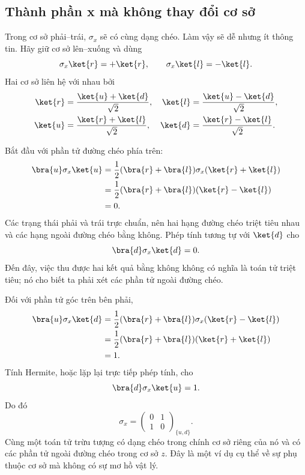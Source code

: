 \subsection{Thành phần x mà không thay đổi cơ sở}

Trong cơ sở phải--trái, \(\sigma_x\) sẽ có cùng dạng chéo. Làm vậy sẽ dễ nhưng ít thông tin. Hãy giữ cơ sở lên--xuống và dùng
\begin{equation}
\sigma_x\ket{r}=+\ket{r},
\qquad
\sigma_x\ket{l}=-\ket{l}.
\label{eq:sigma-x-eigenvectors}
\end{equation}
Hai cơ sở liên hệ với nhau bởi
\begin{align}
\ket{r}&=\frac{\ket{u}+\ket{d}}{\sqrt2},&
\ket{l}&=\frac{\ket{u}-\ket{d}}{\sqrt2},\\
\ket{u}&=\frac{\ket{r}+\ket{l}}{\sqrt2},&
\ket{d}&=\frac{\ket{r}-\ket{l}}{\sqrt2}.
\label{eq:x-z-basis-relations}
\end{align}

Bắt đầu với phần tử đường chéo phía trên:
\begin{align}
\bra{u}\sigma_x\ket{u}
 &=\frac12(\bra{r}+\bra{l})\sigma_x(\ket{r}+\ket{l})\\
 &=\frac12(\bra{r}+\bra{l})(\ket{r}-\ket{l})\\
 &=0.
\end{align}
Các trạng thái phải và trái trực chuẩn, nên hai hạng đường chéo triệt tiêu nhau và các hạng ngoài đường chéo bằng không. Phép tính tương tự với \(\ket{d}\) cho
\[
\bra{d}\sigma_x\ket{d}=0.
\]
Đến đây, việc thu được hai kết quả bằng không không có nghĩa là toán tử triệt tiêu; nó cho biết ta phải xét các phần tử ngoài đường chéo.

Đối với phần tử góc trên bên phải,
\begin{align}
\bra{u}\sigma_x\ket{d}
 &=\frac12(\bra{r}+\bra{l})\sigma_x(\ket{r}-\ket{l})\\
 &=\frac12(\bra{r}+\bra{l})(\ket{r}+\ket{l})\\
 &=1.
\end{align}
Tính Hermite, hoặc lặp lại trực tiếp phép tính, cho
\[
\bra{d}\sigma_x\ket{u}=1.
\]
Do đó
\begin{equation}
\boxed{
\sigma_x=
\begin{pmatrix}
0&1\\
1&0
\end{pmatrix}_{\{u,d\}}.}
\label{eq:sigma-x}
\end{equation}
Cùng một toán tử trừu tượng có dạng chéo trong chính cơ sở riêng của nó và có các phần tử ngoài đường chéo trong cơ sở \(z\). Đây là một ví dụ cụ thể về sự phụ thuộc cơ sở mà không có sự mơ hồ vật lý.

